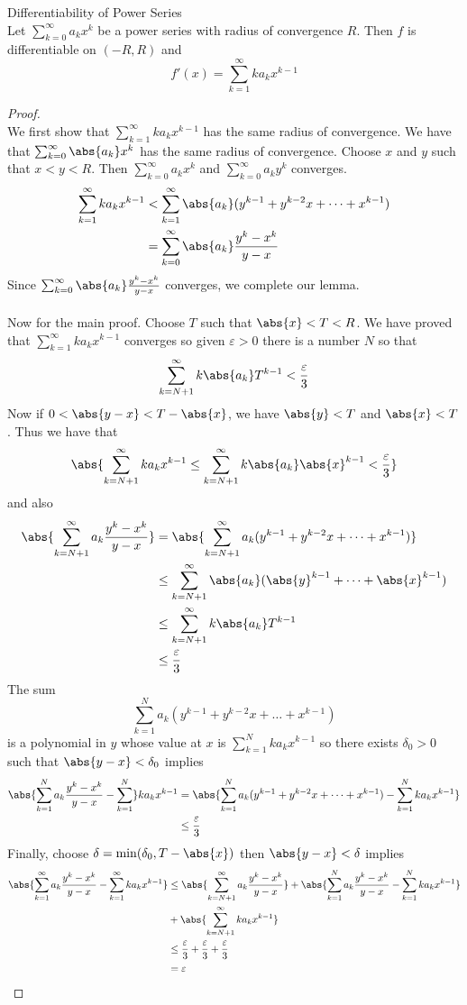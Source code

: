 \documentclass[a4paper]{article}
\begin{document}
\begin{prp}{Differentiability of Power Series}{}\\ Let $\sum_{k=0}^\infty a_kx^k$ be a power series with radius of convergence $R$. Then $f$ is differentiable on $(-R,R)$ and $$f'(x)=\sum_{k=1}^\infty ka_kx^{k-1}$$ 
\begin{proof}\\ We first show that $\sum_{k=1}^\infty ka_kx^{k-1}$ has the same radius of convergence. We have that $\sum_{k=0}^\infty \abs{a_k}x^k$ has the same radius of convergence. Choose $x$ and $y$ such that $x<y<R$. Then $\sum_{k=0}^\infty a_kx^k$ and $\sum_{k=0}^\infty a_ky^k$ converges. 
\begin{align*}
\sum_{k=1}^\infty ka_kx^{k-1}&<\sum_{k=1}^\infty\abs{a_k}(y^{k-1}+y^{k-2}x+\dots+x^{k-1})\\
&=\sum_{k=0}^\infty\abs{a_k}\frac{y^k-x^k}{y-x}
\end{align*}
Since $\sum_{k=0}^\infty\abs{a_k}\frac{y^k-x^k}{y-x}$ converges, we complete our lemma. \\~\\
Now for the main proof. Choose $T$ such that $\abs{x}<T<R$. We have proved that $\sum_{k=1}^\infty ka_kx^{k-1}$ converges so given $\varepsilon>0$ there is a number $N$ so that $$\sum_{k=N+1}^\infty k\abs{a_k}T^{k-1}<\frac{\varepsilon}{3}$$ Now if $0<\abs{y-x}<T-\abs{x}$, we have $\abs{y}<T$ and $\abs{x}<T$. Thus we have that $$\abs{\sum_{k=N+1}^\infty ka_kx^{k-1}\leq\sum_{k=N+1}^\infty k\abs{a_k}\abs{x}^{k-1}<\frac{\varepsilon}{3}}$$ and also
\begin{align*}
\abs{\sum_{k=N+1}^\infty a_k\frac{y^k-x^k}{y-x}}&=\abs{\sum_{k=N+1}^\infty a_k(y^{k-1}+y^{k-2}x+\dots+x^{k-1})}\\
&\leq\sum_{k=N+1}^\infty\abs{a_k}(\abs{y}^{k-1}+\dots+\abs{x}^{k-1})\\
&\leq\sum_{k=N+1}^\infty k\abs{a_k}T^{k-1}\\
&\leq\frac{\varepsilon}{3}
\end{align*} The sum $$\sum_{k=1}^Na_k(y^{k-1}+y^{k-2}x+\dots+x^{k-1})$$ is a polynomial in $y$ whose value at $x$ is $\sum_{k=1}^Nka_kx^{k-1}$ so there exists $\delta_0>0$ such that $\abs{y-x}<\delta_0$ implies 
\begin{align*}
\abs{\sum_{k=1}^Na_k\frac{y^k-x^k}{y-x}-\sum_{k=1}^N}ka_kx^{k-1}&=\abs{\sum_{k=1}^Na_k(y^{k-1}+y^{k-2}x+\dots+x^{k-1})-\sum_{k=1}^Nka_kx^{k-1}}\\
&\leq\frac{\varepsilon}{3}
\end{align*}
Finally, choose $\delta=\min(\delta_0,T-\abs{x})$ then $\abs{y-x}<\delta$ implies
\begin{align*}
\abs{\sum_{k=1}^\infty a_k\frac{y^k-x^k}{y-x}-\sum_{k=1}^\infty ka_kx^{k-1}}&\leq\abs{\sum_{k=N+1}^\infty a_k\frac{y^k-x^k}{y-x}}+\abs{\sum_{k=1}^N a_k\frac{y^k-x^k}{y-x}-\sum_{k=1}^N ka_kx^{k-1}}\\
&+\abs{\sum_{k=N+1}^\infty ka_kx^{k-1}}\\
&\leq\frac{\varepsilon}{3}+\frac{\varepsilon}{3}+\frac{\varepsilon}{3}\\
&=\varepsilon
\end{align*}
\end{proof}
\end{prp}
\end{document}
